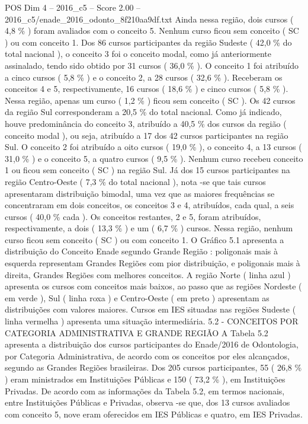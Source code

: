 \begin{textsample}{POS Dim 4 – 2016\_c5 – Score 2.00 – 2016\_c5/enade\_2016\_odonto\_8f210aa9df.txt}
Ainda nessa região, dois cursos ( 4,8 \% ) foram avaliados com o conceito 5.
Nenhum curso ficou sem conceito ( SC ) ou com conceito 1.
Dos 86 cursos participantes da região Sudeste ( 42,0 \% do total nacional ), o conceito 3 foi o conceito modal, como já anteriormente assinalado, tendo sido obtido por 31 cursos ( 36,0 \% ).
O conceito 1 foi atribuído a cinco cursos ( 5,8 \% ) e o conceito 2, a 28 cursos ( 32,6 \% ).
Receberam os conceitos 4 e 5, respectivamente, 16 cursos ( 18,6 \% ) e cinco cursos ( 5,8 \% ).
Nessa região, apenas um curso ( 1,2 \% ) ficou sem conceito ( SC ).
Os 42 cursos da região Sul corresponderam a 20,5 \% do total nacional.
Como já indicado, houve predominância do conceito 3, atribuído a 40,5 \% dos cursos da região ( conceito modal ), ou seja, atribuído a 17 dos 42 cursos participantes na região Sul.
O conceito 2 foi atribuído a oito cursos ( 19,0 \% ), o conceito 4, a 13 cursos ( 31,0 \% ) e o conceito 5, a quatro cursos ( 9,5 \% ).
Nenhum curso recebeu conceito 1 ou ficou sem conceito ( SC ) na região Sul.
Já dos 15 cursos participantes na região Centro-Oeste ( 7,3 \% do total nacional ), nota -se que tais cursos apresentaram distribuição bimodal, uma vez que as maiores frequências se concentraram em dois conceitos, os conceitos 3 e 4, atribuídos, cada qual, a seis cursos ( 40,0 \% cada ).
Os conceitos restantes, 2 e 5, foram atribuídos, respectivamente, a dois ( 13,3 \% ) e um ( 6,7 \% ) cursos.
Nessa região, nenhum curso ficou sem conceito ( SC ) ou com conceito 1.
O Gráfico 5.1 apresenta a distribuição do Conceito Enade segundo Grande Região : poligonais mais à esquerda representam Grandes Regiões com pior distribuição, e poligonais mais à direita, Grandes Regiões com melhores conceitos.
A região Norte ( linha azul ) apresenta os cursos com conceitos mais baixos, ao passo que as regiões Nordeste ( em verde ), Sul ( linha roxa ) e Centro-Oeste ( em preto ) apresentam as distribuições com valores maiores.
Cursos em IES situadas nas regiões Sudeste ( linha vermelha ) apresenta uma situação intermediária. 5.2 - CONCEITOS POR CATEGORIA ADMINISTRATIVA E GRANDE REGIÃO A Tabela 5.2 apresenta a distribuição dos cursos participantes do Enade/2016 de Odontologia, por Categoria Administrativa, de acordo com os conceitos por eles alcançados, segundo as Grandes Regiões brasileiras.
Dos 205 cursos participantes, 55 ( 26,8 \% ) eram ministrados em Instituições Públicas e 150 ( 73,2 \% ), em Instituições Privadas.
De acordo com as informações da Tabela 5.2, em termos nacionais, entre Instituições Públicas e Privadas, observa -se que, dos 13 cursos avaliados com conceito 5, nove eram oferecidos em IES Públicas e quatro, em IES Privadas.

\end{textsample}
